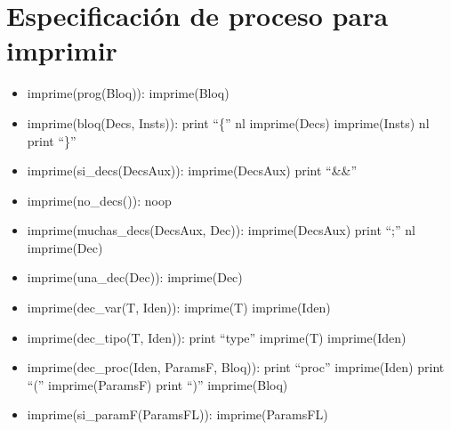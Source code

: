 \documentclass[11pt]{article}
\begin{document}
    \section{Especificación de proceso para imprimir}
        \begin{itemize}
            \item imprime(prog(Bloq)):
                \subitem imprime(Bloq)
            
            \item imprime(bloq(Decs, Insts)):
                \subitem print “\{”
                \subitem nl
                \subitem imprime(Decs)
                \subitem imprime(Insts)
                \subitem nl
                \subitem print “\}”
            
            \item imprime(si\_decs(DecsAux)):
                \subitem imprime(DecsAux)
                \subitem print “\&\&”
            
            \item imprime(no\_decs()): noop
            
            \item imprime(muchas\_decs(DecsAux, Dec)):
                \subitem imprime(DecsAux)
                \subitem print “;”
                \subitem nl
                \subitem imprime(Dec)
            
            \item imprime(una\_dec(Dec)):
                \subitem imprime(Dec)
            
            \item imprime(dec\_var(T, Iden)):
                \subitem imprime(T)
                \subitem imprime(Iden)
            
            \item imprime(dec\_tipo(T, Iden)):
                \subitem print “type”
                \subitem imprime(T)
                \subitem imprime(Iden)
            
            \item imprime(dec\_proc(Iden, ParamsF, Bloq)):
                \subitem print “proc”
                \subitem imprime(Iden)
                \subitem print “(”
                \subitem imprime(ParamsF)
                \subitem print “)”
                \subitem imprime(Bloq)
            
            \item imprime(si\_paramF(ParamsFL)):
                \subitem imprime(ParamsFL)
            

\end{itemize}
\end{document}
